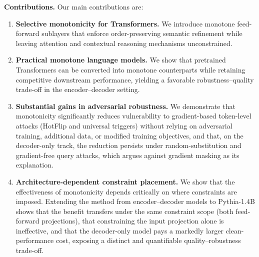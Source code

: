 \documentclass{article}
\theoremstyle{plain}
\theoremstyle{definition}
\theoremstyle{remark}
\begin{document}
\noindent\textbf{Contributions.}
Our main contributions are:
\vspace{-1em}
\begin{enumerate}
    \item \textbf{Selective monotonicity for Transformers.}
    We introduce monotone feed-forward sublayers that enforce
    order-preserving semantic refinement while leaving attention and contextual
    reasoning mechanisms unconstrained.

    \item \textbf{Practical monotone language models.}
    We show that pretrained Transformers can be converted into monotone
    counterparts while retaining competitive downstream performance, yielding
    a favorable robustness--quality trade-off in the encoder--decoder setting.

    \item \textbf{Substantial gains in adversarial robustness.}
    We demonstrate that monotonicity significantly reduces vulnerability to
    gradient-based token-level attacks (HotFlip and universal triggers) without relying on
    adversarial training, additional data, or modified training objectives,
    and that, on the decoder-only track, the reduction persists under
    random-substitution and gradient-free query attacks, which argues
    against gradient masking as its explanation.

    \item \textbf{Architecture-dependent constraint placement.}
    We show that the effectiveness of monotonicity depends critically on where
    constraints are imposed. Extending the method from encoder--decoder models
    to Pythia-1.4B shows that the benefit transfers under the same constraint
    scope (both feed-forward projections), that constraining the input
    projection alone is ineffective, and that the decoder-only model pays a
    markedly larger clean-performance cost, exposing a distinct and quantifiable
    quality--robustness trade-off.
\end{enumerate}
\end{document}
